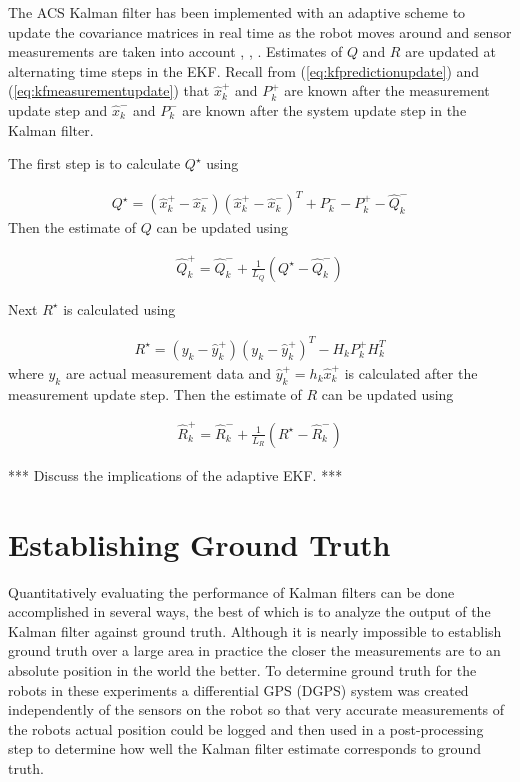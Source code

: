 The ACS Kalman filter has been implemented with an adaptive scheme to update the covariance matrices in real time as the robot moves around and sensor measurements are taken into account \cite{Sights06}, \cite{Mehra72}, \cite{Busse03adaptiveEKF}. Estimates of $Q$ and $R$ are updated at alternating time steps in the EKF. Recall from (\ref{eq:kfpredictionupdate}) and (\ref{eq:kfmeasurementupdate}) that $\hat{x}_k^+$ and $P_k^+$ are known after the measurement update step and $\hat{x}_k^-$ and $P_k^-$ are known after the system update step in the Kalman filter.

The first step is to calculate $Q^\star$ using

\begin{align}
\label{eq:qstar}
Q^\star = \left(\hat{x}_k^+-\hat{x}_k^-\right)\left(\hat{x}_k^+-\hat{x}_k^-\right)^T + P_k^- - P_k^+ - \hat{Q}_k^-
\end{align}
Then the estimate of $Q$ can be updated using

\begin{align}
\label{eq:qadapt}
\hat{Q}_k^+ = \hat{Q}_k^- + \frac{1}{L_Q}\left(Q^\star-\hat{Q}_k^-\right)
\end{align}

Next $R^\star$ is calculated using

\begin{align}
\label{eq:rstar}
R^\star = \left(y_k-\hat{y}_k^+\right)\left(y_k-\hat{y}_k^+\right)^T - H_kP_k^+H_k^T
\end{align}
where $y_k$ are actual measurement data and $\hat{y}_k^+ = h_k\hat{x}_k^+$ is calculated after the measurement update step. Then the estimate of $R$ can be updated using

\begin{align}
\label{eq:radapt}
\hat{R}_k^+ = \hat{R}_k^- + \frac{1}{L_R}\left(R^\star-\hat{R}_k^-\right)
\end{align}

*** Discuss the implications of the adaptive EKF. ***

\section{Establishing Ground Truth}
\label{sec:groundtruth}
Quantitatively evaluating the performance of Kalman filters can be done accomplished in several ways, the best of which is to analyze the output of the Kalman filter against ground truth. Although it is nearly impossible to establish ground truth over a large area in practice the closer the measurements are to an absolute position in the world the better. To determine ground truth for the robots in these experiments a differential GPS (DGPS) system was created independently of the sensors on the robot so that very accurate measurements of the robots actual position could be logged and then used in a post-processing step to determine how well the Kalman filter estimate corresponds to ground truth.

